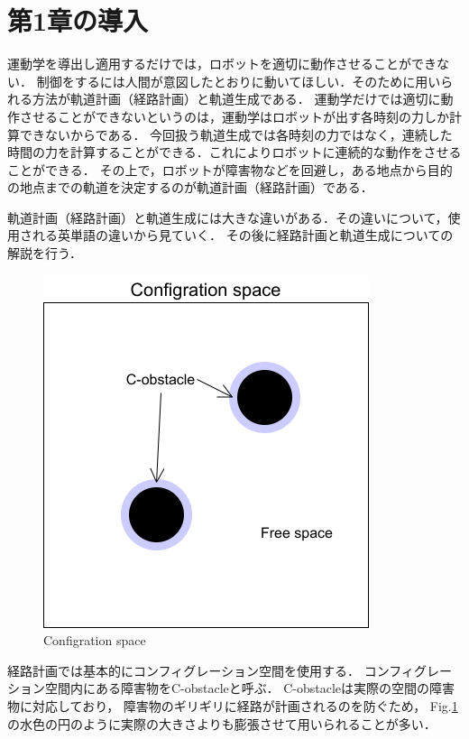 
\section{第1章の導入}

運動学を導出し適用するだけでは，ロボットを適切に動作させることができない．
制御をするには人間が意図したとおりに動いてほしい．そのために用いられる方法が軌道計画（経路計画）と軌道生成である．
運動学だけでは適切に動作させることができないというのは，運動学はロボットが出す各時刻の力しか計算できないからである．
今回扱う軌道生成では各時刻の力ではなく，連続した時間の力を計算することができる．これによりロボットに連続的な動作をさせることができる．
その上で，ロボットが障害物などを回避し，ある地点から目的の地点までの軌道を決定するのが軌道計画（経路計画）である．

軌道計画（経路計画）と軌道生成には大きな違いがある．その違いについて，使用される英単語の違いから見ていく．
その後に経路計画と軌道生成についての解説を行う．
\newpage

\begin{figure}[hbtp]
  \centering
 \includegraphics[keepaspectratio, scale=0.8]
      {images/png/ConfigrationSpace.drawio.png}
 \caption{Configration space}
 \label{Fig:ConfigrationSpace}
\end{figure}

経路計画では基本的にコンフィグレーション空間を使用する．
コンフィグレーション空間内にある障害物をC-obstacleと呼ぶ．
C-obstacleは実際の空間の障害物に対応しており，
障害物のギリギリに経路が計画されるのを防ぐため，
Fig.\ref{Fig:ConfigrationSpace}の水色の円のように実際の大きさよりも膨張させて用いられることが多い．

\newpage
